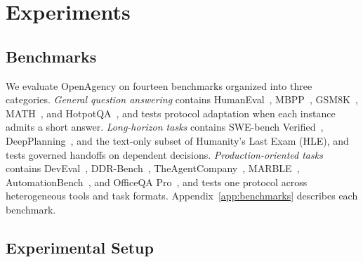 \documentclass{article} %
\begin{document}
\section{Experiments}
\label{sec:experiments}


\subsection{Benchmarks}
\label{sec:benchmarks}

We evaluate OpenAgency on fourteen benchmarks organized into three categories. \emph{General question answering} contains HumanEval~\citep{chen2021humaneval}, MBPP~\citep{austin2021mbpp}, GSM8K~\citep{cobbe2021gsm8k}, MATH~\citep{hendrycks2021math}, and HotpotQA~\citep{yang2018hotpotqa}, and tests protocol adaptation when each instance admits a short answer. \emph{Long-horizon tasks} contains SWE-bench Verified~\citep{jimenez2024swebench}, DeepPlanning~\citep{zhang2026deepplanning}, and the text-only subset of Humanity's Last Exam (HLE), and tests governed handoffs on dependent decisions. \emph{Production-oriented tasks} contains DevEval~\citep{li2024deveval}, DDR-Bench~\citep{liu2026ddrbench}, TheAgentCompany~\citep{xu2024theagentcompany}, MARBLE~\citep{zhu2025marble}, AutomationBench~\citep{shepard2026automationbench}, and OfficeQA Pro~\citep{opsahlong2026officeqa}, and tests one protocol across heterogeneous tools and task formats. Appendix~\ref{app:benchmarks} describes each benchmark.

\subsection{Experimental Setup}
\label{sec:setup}
\end{document}
